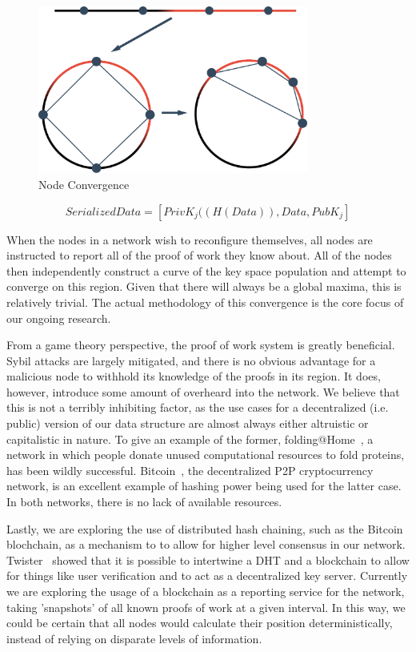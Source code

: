 \documentclass[10pt]{IEEEtran}
\begin{document}
\begin{figure}[!t]
\centering
\includegraphics[width=3.5in]{unevenDistro}
\caption{Node Convergence}
\label{fig_kSpaceUneven}
\end{figure}

\begin{equation} \label{eq:proof}
SerializedData = [PrivK_{j}((H(Data)), Data, PubK_{j}]
\end{equation}

\par When the nodes in a network wish to reconfigure themselves, all nodes are instructed to report all of the proof of work they know about. All of the nodes then independently construct a curve of the key space population and attempt to converge on this region. Given that there will always be a global maxima, this is relatively trivial. The actual methodology of this convergence is the core focus of our ongoing research.

\par From a game theory perspective, the proof of work system is greatly beneficial. Sybil attacks are largely mitigated, and there is no obvious advantage for a malicious node to withhold its knowledge of the proofs in its region. It does, however, introduce some amount of overheard into the network. We believe that this is not a terribly inhibiting factor, as the use cases for a decentralized (i.e. public) version of our data structure are almost always either altruistic or capitalistic in nature. To give an example of the former, folding@Home~\cite{Anderson:2002vr}, a network in which people donate unused computational resources to fold proteins, has been wildly successful. Bitcoin~\cite{Nakamoto:2008ti}, the decentralized P2P cryptocurrency network, is an excellent example of hashing power being used for the latter case. In both networks, there is no lack of available resources.

\par Lastly, we are exploring the use of distributed hash chaining, such as the Bitcoin blochchain, as a mechanism to to allow for higher level consensus in our network. Twister~\cite{Freitas:2013tb} showed that it is possible to intertwine a DHT and a blockchain to allow for things like user verification and to act as a decentralized key server. Currently we are exploring the usage of a blockchain as a reporting service for the network, taking 'snapshots' of all known proofs of work at a given interval. In this way, we could be certain that all nodes would calculate their position deterministically, instead of relying on disparate levels of information.
\end{document}

